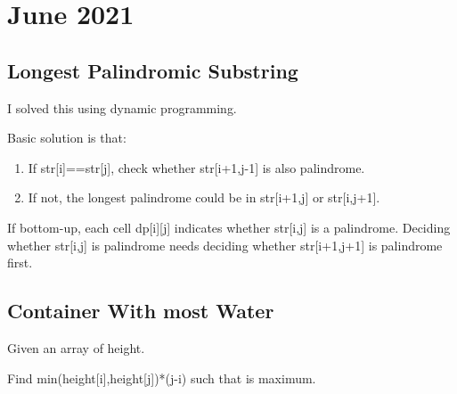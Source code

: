 \chapter{June 2021}

\section{Longest Palindromic Substring}

    I solved this using dynamic programming.

    Basic solution is that:
    \begin{enumerate}
        \item If str[i]==str[j], check whether str[i+1,j-1] is also palindrome.
        \item If not, the longest palindrome could be in str[i+1,j] or str[i,j+1].
    \end{enumerate}

    If bottom-up, each cell dp[i][j] indicates whether str[i,j] is 
    a palindrome. Deciding whether str[i,j] is palindrome needs 
    deciding whether str[i+1,j+1] is palindrome first.

\section{Container With most Water}

    Given an array of height.

    Find min(height[i],height[j])*(j-i) such that is maximum.
    
    